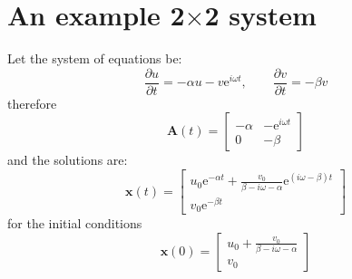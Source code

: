 \documentclass{article}
\begin{document}
\section*{An example 2$\times$2 system}
Let the system of equations be:
\begin{equation}
 \frac{\partial{u}}{\partial{t}}=-\alpha u-v\mathrm{e}^{i\omega{t}},
 \qquad \frac{\partial{v}}{\partial{t}}=-\beta{} v
 \label{eq:example}
\end{equation}
therefore
\begin{equation}
 \mathbf{A}(t)=
 \begin{bmatrix*}
  -\alpha & -\mathrm{e}^{i\omega{t}} \\
  0 & -\beta
 \end{bmatrix*} %
\end{equation}
and the solutions are:
\begin{equation}
 \mathbf{x}(t)=
 \begin{bmatrix*}
  u_0\mathrm{e}^{-\alpha{t}}+\frac{v_0}{\beta-i\omega-\alpha}\mathrm{e}^{(i\omega-\beta){t}} \\
  v_0\mathrm{e}^{-\beta{t}}
 \end{bmatrix*}
 \label{eq:analytical_soln}
\end{equation}
for the initial conditions
\begin{equation}
 \mathbf{x}(0)=
 \begin{bmatrix*}
  u_0+\frac{v_0}{\beta-i\omega-\alpha} \\
  v_0
 \end{bmatrix*}
\end{equation}
\end{document}
